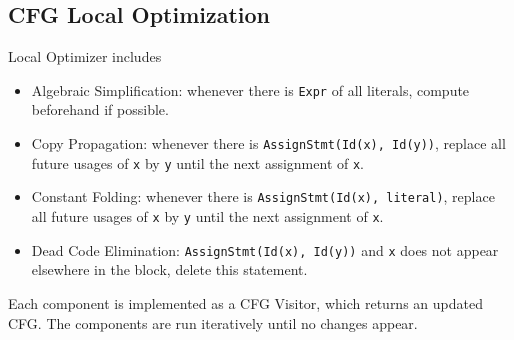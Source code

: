 \subsection{CFG Local Optimization}
Local Optimizer includes
\begin{itemize}
  \item Algebraic Simplification: whenever there is \texttt{Expr} of all literals, compute beforehand if possible.
  \item Copy Propagation: whenever there is \texttt{AssignStmt(Id(x), Id(y))}, replace all future usages of \texttt{x} by \texttt{y} until the next assignment of \texttt{x}.
  \item Constant Folding: whenever there is \texttt{AssignStmt(Id(x), literal)}, replace all future usages of \texttt{x} by \texttt{y} until the next assignment of \texttt{x}.
  \item Dead Code Elimination: \texttt{AssignStmt(Id(x), Id(y))} and \texttt{x} does not appear elsewhere in the block, delete this statement.
\end{itemize}

Each component is implemented as a CFG Visitor, which returns an updated CFG. The components are run iteratively until no changes appear.
